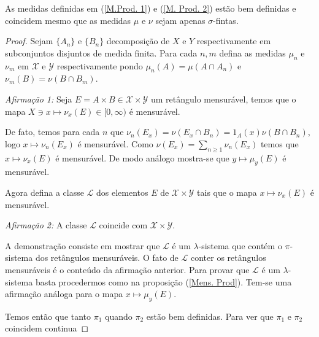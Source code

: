 \begin{corolario}
As medidas definidas em (\ref{M.Prod. 1}) e (\ref{M. Prod. 2}) estão bem definidas e  coincidem mesmo que as medidas 
$\mu$ e $\nu$ sejam apenas $\sigma$-fintas.
\end{corolario}

\begin{proof}
Sejam $\{A_n\}$ e $\{B_n\}$ decomposição de $X$ e $Y$ respectivamente em subconjuntos 
disjuntos de medida finita. Para cada $n,m$ defina as medidas $\mu_n$ e $\nu_m$ 
em  $\mathscr{X}$ e $ \mathscr{Y}$ respectivamente  pondo  $\mu_n(A)=\mu(A\cap A_n)$ e 
$\nu_m(B)=\nu(B\cap B_m)$. 
\medskip

\noindent \emph{Afirmação 1:} Seja $E=A\times B\in \mathscr{X}\times \mathscr{Y}$ um retângulo mensurável, temos que o mapa 
$X\ni x\mapsto \nu_x(E)\in [0, \infty)$ é mensurável.
\medskip


 De fato, temos para cada $n$ que  $\nu_n(E_x)=\nu(E_x\cap B_n)=1_A(x)  \nu(B\cap B_n)$, logo 
 $x\mapsto \nu_n(E_x)$ é mensurável. Como $\nu(E_x)=\sum_{n\geq 1}\nu_n(E_x)$ temos que 
 $x\mapsto \nu_x(E)$ é mensurável. De modo análogo mostra-se que $y\mapsto \mu_y(E)$ é mensurável.

Agora defina a classe $\mathscr{L}$ dos elementos $E$ de $\mathscr{X}\times \mathscr{Y}$ tais que 
o mapa $x\mapsto \nu_x(E)$ é mensurável.

\noindent \emph{Afirmação 2:} A classe $\mathscr{L}$ coincide com $\mathscr{X}\times \mathscr{Y}$.
\medskip

A demonstração consiste em mostrar que $\mathscr{L}$ é um $\lambda$-sistema que contém o $\pi$-sistema dos 
retângulos mensuráveis.
 O fato de $\mathscr{L}$ conter os retângulos 
 mensuráveis é o conteúdo da afirmação anterior.
 Para provar que $\mathscr{L}$ é um $\lambda$-sistema basta procedermos como na proposição (\ref{Mens. Prod}).
  Tem-se uma afirmação análoga para o mapa $x\mapsto \mu_y(E)$. 
  
  Temos então que tanto $\pi_1$ quando $\pi_2$ estão bem definidas. Para ver que $\pi_1$ e $\pi_2$ coincidem 
{\red continua}


\end{proof}
